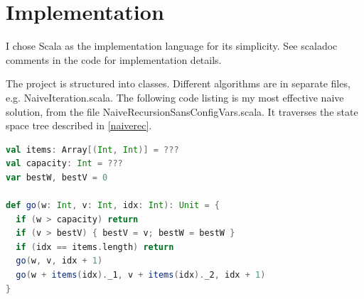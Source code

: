 \documentclass[a4paper,10pt,twocolumn]{article}
\begin{document}
\section{Implementation} %
I chose Scala as the implementation language for its simplicity. See scaladoc comments in the code for implementation
details.

The project is structured into classes. Different algorithms are in separate files, e.g. NaiveIteration.scala. The
following code listing is my most effective naive solution, from the file NaiveRecursionSansConfigVars.scala. It
traverses the state space tree described in \ref{naiverec}.

\begin{lstlisting}[language=scala]
val items: Array[(Int, Int)] = ???
val capacity: Int = ???
var bestW, bestV = 0

def go(w: Int, v: Int, idx: Int): Unit = {
  if (w > capacity) return
  if (v > bestV) { bestV = v; bestW = bestW }
  if (idx == items.length) return
  go(w, v, idx + 1)
  go(w + items(idx)._1, v + items(idx)._2, idx + 1)
}
\end{lstlisting}
\end{document}
